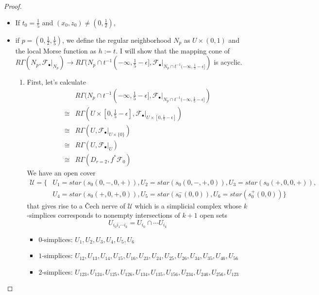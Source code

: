 \begin{proof}
\begin{enumerate}[label=(Case \arabic*)~]
\begin{itemize}
\item If $t_0 = \frac{1}{5}$ and $(x_0,z_0)\neq (0,\frac{1}{2})$,

\item if $p = (0,\frac{1}{2},\frac{1}{5})$, we define the regular neighborhood $N_p$ as $U\times (0,1)$ and the local Morse function as $h:=t$. I will show that the mapping cone of $R\Gamma(N_p,\mathscr{F}_\bullet|_{N_p})\rightarrow R\Gamma(N_p\cap t^{-1}(-\infty,\frac{1}{5}-\epsilon],\mathscr{F}_\bullet|_{N_p\cap t^{-1}(-\infty,\frac{1}{5}-\epsilon]})$ is acyclic.
\begin{enumerate}[label = (\roman*)]
\item First, let's calculate
\begin{align*}
&R\Gamma(N_p\cap t^{-1}(-\infty,\frac{1}{5}-\epsilon],\mathscr{F}_\bullet|_{N_p\cap t^{-1}(-\infty,\frac{1}{5}-\epsilon]})\\
\cong & R\Gamma(U\times [0,\frac{1}{5}-\epsilon],\mathscr{F}_\bullet|_{U\times [0,\frac{1}{5}-\epsilon]})\\
\cong & R\Gamma(U,\mathscr{F}_\bullet|_{U\times \{0\}})\\
\cong & R\Gamma(U,\mathscr{F}_\bullet|_{U})\\
\cong & R\Gamma(D_{r=2},f^{*}\mathscr{F}_0)
\end{align*}
We have an open cover 
\begin{align*}
\mathcal{U} = \{&U_1 = star(s_0(0,-,0,+)), U_2=star(s_0(0,-,+,0)), U_3=star(s_0(+,0,0,+)),\\ 
&U_4=star(s_0(+,0,+,0)), U_5=star(s_0^-(0,0)), U_6=star(s_0^+(0,0))\}
\end{align*} 
that gives rise to a \v{C}ech nerve of $\mathcal{U}$ which is a simplicial complex whose $k$-simplices corresponds to nonempty intersections of $k+1$ open sets
\[
U_{i_0 i_1 \cdots i_k} = U_{i_0}\cap \cdots U_{i_k}
\]

\begin{itemize}
\item $0$-simplices: $U_1,U_2,U_3,U_4,U_5,U_6$

\item $1$-simplices: $U_{12},U_{13},U_{14},U_{15},U_{16},U_{23},U_{24},U_{25},U_{26},U_{34},U_{35},U_{46},U_{56}$

\item $2$-simplices: $U_{123},U_{124},U_{125},U_{126},U_{134},U_{135},U_{156},U_{234},U_{246},U_{256},U_{123}$


\end{itemize}
\end{enumerate}
\end{itemize}
\end{enumerate}
\end{proof}
